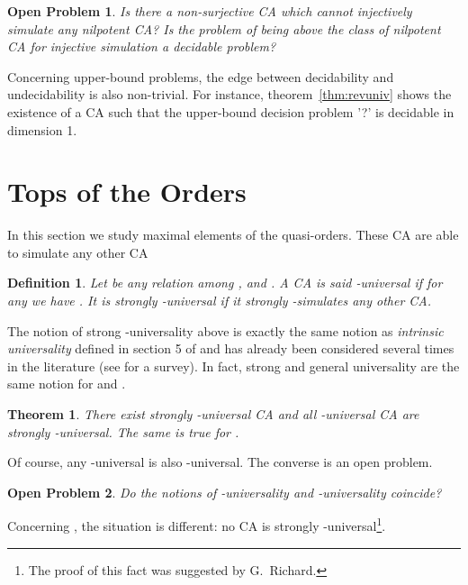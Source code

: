 \documentclass[a4paper]{elsarticle}
\def\qed{\relax\ifmmode\hskip2em \blacksquare\else\unskip\nobreak\hfill\hskip1em \fi}
\newtheorem{defn}{Definition}[section]
\newtheorem{thm}{Theorem}[section]
\newtheorem{openpb}{Open Problem}
\begin{document}
\begin{openpb}
  \label{open:abovenilpo}
  Is there a non-surjective CA  which cannot injectively
  simulate any nilpotent CA? Is the problem of being above the class
  of nilpotent CA for injective simulation a decidable problem?
\end{openpb}


Concerning upper-bound problems, the edge between decidability and
undecidability is also non-trivial.  For instance,
theorem~\ref{thm:revuniv} shows the existence of a CA  such that
the upper-bound decision problem '?' is decidable in
dimension 1.


\section{Tops of the Orders}
\label{sec:top}

In this section we study maximal elements of the
quasi-orders. These CA are able to simulate any other CA

\begin{defn}
  Let  be any relation among ,  and
  . A CA  is said \emph{-universal} if for
  any  we have . It is \emph{strongly
    -universal} if it strongly -simulates any other CA.
\end{defn}

The notion of strong -universality above is exactly the same
notion as \emph{intrinsic universality} defined in section 5 of
\cite{bulking1} and has already been considered several times in the
literature (see \cite{JACsurvey} for a survey). In fact, strong and
general universality are the same notion for  and
.

\begin{thm}
  \label{thm:stronguniv}
  There exist strongly -universal CA and all
  -universal CA are strongly -universal. The same
  is true for .
\end{thm}

Of course, any -universal is also
-universal. The converse is an open problem.

\begin{openpb}
  Do the notions of -universality and
  -universality coincide?
\end{openpb}


Concerning , the situation is different: no CA is strongly
-universal\footnote{The proof of this fact was suggested by
  G.~Richard.}.
\end{document}
